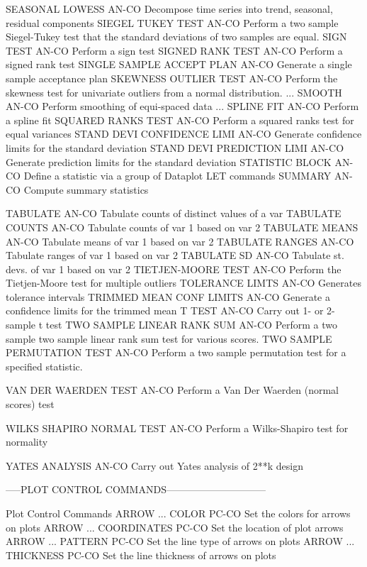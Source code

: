 SEASONAL LOWESS             AN-CO Decompose time series into trend, seasonal, residual components
SIEGEL TUKEY TEST           AN-CO Perform a two sample Siegel-Tukey test that the standard deviations of two samples are equal.
SIGN TEST                   AN-CO Perform a sign test
SIGNED RANK TEST            AN-CO Perform a signed rank test
SINGLE SAMPLE ACCEPT PLAN   AN-CO Generate a single sample acceptance plan
SKEWNESS OUTLIER TEST       AN-CO Perform the skewness test for univariate outliers from a normal distribution.
... SMOOTH                  AN-CO Perform smoothing of equi-spaced data
... SPLINE FIT              AN-CO Perform a spline fit
SQUARED RANKS TEST          AN-CO Perform a squared ranks test for equal variances
STAND DEVI CONFIDENCE LIMI  AN-CO Generate confidence limits for the standard deviation
STAND DEVI PREDICTION LIMI  AN-CO Generate prediction limits for the standard deviation
STATISTIC BLOCK             AN-CO Define a statistic via a group of Dataplot LET commands
SUMMARY                     AN-CO Compute summary statistics

TABULATE                    AN-CO Tabulate counts of distinct values of a var
TABULATE COUNTS             AN-CO Tabulate counts of var 1 based on var 2
TABULATE MEANS              AN-CO Tabulate means of var 1 based on var 2
TABULATE RANGES             AN-CO Tabulate ranges of var 1 based on var 2
TABULATE SD                 AN-CO Tabulate st. devs. of var 1 based on var 2
TIETJEN-MOORE TEST          AN-CO Perform the Tietjen-Moore test for multiple outliers
TOLERANCE LIMTS             AN-CO Generates tolerance intervals
TRIMMED MEAN CONF LIMITS    AN-CO Generate a confidence limits for the trimmed mean
T TEST                      AN-CO Carry out 1- or 2-sample t test
TWO SAMPLE LINEAR RANK SUM  AN-CO Perform a two sample two sample linear rank sum test for various scores.
TWO SAMPLE PERMUTATION TEST AN-CO Perform a two sample permutation test for a specified statistic.

VAN DER WAERDEN TEST        AN-CO Perform a Van Der Waerden (normal scores) test

WILKS SHAPIRO NORMAL TEST   AN-CO Perform a Wilks-Shapiro test for normality

YATES ANALYSIS              AN-CO Carry out Yates analysis of 2**k design

-----PLOT CONTROL COMMANDS------------------------------

Plot Control Commands
ARROW ... COLOR             PC-CO Set the colors for arrows on plots
ARROW ... COORDINATES       PC-CO Set the location of plot arrows
ARROW ... PATTERN           PC-CO Set the line type of arrows on plots
ARROW ... THICKNESS         PC-CO Set the line thickness of arrows on plots


